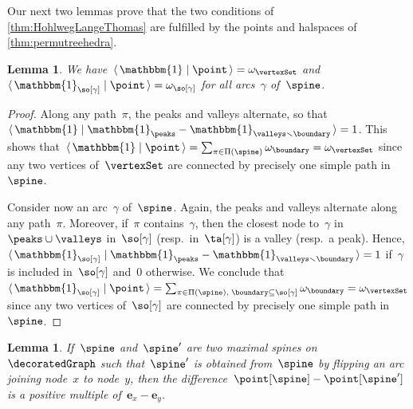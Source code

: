\documentclass{amsart}
\newtheorem{lemma}[theorem]{Lemma}
\theoremstyle{definition}
\renewcommand{\b}[1]{{\boldsymbol{#1}}} %
\newcommand{\ssm}{\smallsetminus} %
\newcommand{\dotprod}[2]{\langle \, #1 \; | \; #2 \, \rangle} %
\newcommand{\one}{\mathbbm{1}} %
\newcommand{\weight}{\omega} %
\begin{document}
Our next two lemmas prove that the two conditions of \cref{thm:HohlwegLangeThomas} are fulfilled by the points and halspaces of \cref{thm:permutreehedra}.

\begin{lemma}
  \label{lem:vertexFacetIncidences}
  We have~$\dotprod{\one}{\point} = \weight_{\vertexSet}$ and $\dotprod{\one_{\so[\gamma]}}{\point} = \weight_{\so[\gamma]}$ for all arcs~$\gamma$ of~$\spine$.
\end{lemma}

\begin{proof}
  Along any path~$\pi$, the peaks and valleys alternate, so that~$\dotprod{\one}{\one_{\peaks} - \one_{\valleys \ssm \boundary}} = 1$.
  This shows that~$\dotprod{\one}{\point} = \sum_{\pi \in \Pi(\spine)} \weight_{\boundary} = \weight_{\vertexSet}$ since any two vertices of~$\vertexSet$ are connected by precisely one simple path in~$\spine$.
  
  Consider now an arc~$\gamma$ of~$\spine$.
  Again, the peaks and valleys alternate along any path~$\pi$.
  Moreover, if~$\pi$ contains~$\gamma$, then the closest node to~$\gamma$ in~$\peaks \cup \valleys$ in~$\so[\gamma]$ (resp.~in~$\ta[\gamma]$) is a valley (resp.~a peak).
  Hence, $\dotprod{\one_{\so[\gamma]}}{\one_{\peaks} - \one_{\valleys \ssm \boundary}} = 1$ if~$\gamma$ is included in~$\so[\gamma]$ and~$0$ otherwise.
  We conclude that~$\dotprod{\one_{\so[\gamma]}}{\point} = \sum_{\pi \in \Pi(\spine), \; \boundary \subseteq \so[\gamma]} \weight_{\boundary} = \weight_{\vertexSet}$ since any two vertices of~$\so[\gamma]$ are connected by precisely one simple path in~$\spine$.
\end{proof}

\begin{lemma}
  \label{lem:flipDifference}
  If~$\spine$ and~$\spine'$ are two maximal spines on~$\decoratedGraph$ such that~$\spine'$ is obtained from~$\spine$ by flipping an arc joining node~$x$ to node~$y$, then the difference~$\point[\spine] - \point[\spine']$ is a positive multiple of~$\b{e}_x - \b{e}_y$.
\end{lemma}
\end{document}
